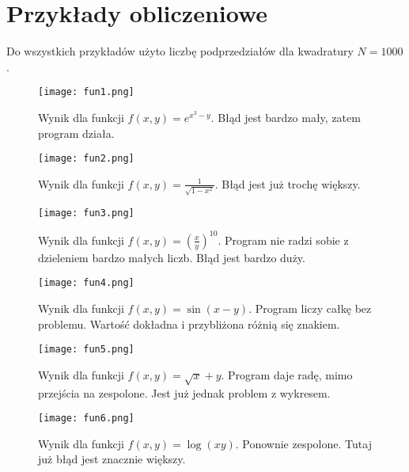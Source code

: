 \documentclass[12pt]{article}
\begin{document}
\vskip20pt

\section{Przyk\l ady obliczeniowe}

Do wszystkich przykładów  użyto liczbę podprzedziałów dla kwadratury $N = 1000$.

\begin{figure}[H]
    \centering
    \texttt{[image: fun1.png]}
    \caption{Wynik dla funkcji $f(x,y) = e^{x^3-y}$. Błąd jest bardzo mały, zatem program działa.}
    \label{fun1}
\end{figure}

\begin{figure}[H]
    \centering
    \texttt{[image: fun2.png]}
    \caption{Wynik dla funkcji $f(x,y) = \frac{1}{\sqrt{1-x^2}}$. Błąd jest już trochę większy.}
    \label{fun2}
\end{figure}

\begin{figure}[H]
    \centering
    \texttt{[image: fun3.png]}
    \caption{Wynik dla funkcji $f(x,y) = (\frac{x}{y})^{10}$. Program nie radzi sobie z dzieleniem bardzo małych liczb. Błąd jest bardzo duży.}
    \label{fun3}
\end{figure}

\begin{figure}[H]
    \centering
    \texttt{[image: fun4.png]}
    \caption{Wynik dla funkcji $f(x,y) = \sin(x-y)$. Program liczy całkę bez problemu. Wartość dokładna i przybliżona różnią się znakiem.}
    \label{fun4}
\end{figure}

\begin{figure}[H]
    \centering
    \texttt{[image: fun5.png]}
    \caption{Wynik dla funkcji $f(x,y) = \sqrt{x}+y$. Program daje radę, mimo przejścia na zespolone. Jest już jednak problem z wykresem.}
    \label{fun5}
\end{figure}

\begin{figure}[H]
    \centering
    \texttt{[image: fun6.png]}
    \caption{Wynik dla funkcji $f(x,y) = \log(xy)$. Ponownie zespolone. Tutaj już błąd jest znacznie większy.}
    \label{fun6}
\end{figure}

\bigskip
\end{document}

